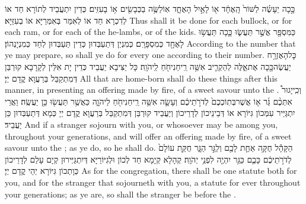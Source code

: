 {כָּ֣כָה יֵעָשֶׂ֗ה לַשּׁוֹר֙ הָֽאֶחָ֔ד א֖וֹ לָאַ֣יִל הָאֶחָ֑ד אֽוֹ\maqqaf לַשֶּׂ֥ה בַכְּבָשִׂ֖ים א֥וֹ בָעִזִּֽים׃}
{כְּדֵין יִתְעֲבֵיד לְתוֹרָא חַד אוֹ לְדִכְרָא חַד אוֹ לְאִמַּר בְּאִמְּרַיָּא אוֹ בְעִזַּיָּא׃}
{Thus shall it be done for each bullock, or for each ram, or for each of the he-lambs, or of the kids.}{}
{כַּמִּסְפָּ֖ר אֲשֶׁ֣ר תַּעֲשׂ֑וּ כָּ֛כָה תַּעֲשׂ֥וּ לָאֶחָ֖ד כְּמִסְפָּרָֽם׃}
{כְּמִנְיַן דְּתַעְבְּדוּן כְּדֵין תַּעְבְּדוּן לְחַד כְּמִנְיָנְהוֹן׃}
{According to the number that ye may prepare, so shall ye do for every one according to their number.}{}
{כׇּל\maqqaf הָאֶזְרָ֥ח יַעֲשֶׂה\maqqaf כָּ֖כָה אֶת\maqqaf אֵ֑לֶּה לְהַקְרִ֛יב אִשֵּׁ֥ה רֵֽיחַ\maqqaf נִיחֹ֖חַ לַֽיהֹוָֽה׃}
{כָּל יַצִּיבָא יַעֲבֵיד כְּדֵין יָת אִלֵּין לְקָרָבָא קוּרְבַּן דְּמִתְקַבַּל בְּרַעֲוָא קֳדָם יְיָ׃}
{All that are home-born shall do these things after this manner, in presenting an offering made by fire, of a sweet savour unto the \lord.}{}
{וְכִֽי\maqqaf יָגוּר֩ אִתְּכֶ֨ם גֵּ֜ר א֤וֹ אֲשֶׁר\maqqaf בְּתֽוֹכְכֶם֙ לְדֹרֹ֣תֵיכֶ֔ם וְעָשָׂ֛ה אִשֵּׁ֥ה רֵֽיחַ\maqqaf נִיחֹ֖חַ לַיהֹוָ֑ה כַּאֲשֶׁ֥ר תַּעֲשׂ֖וּ כֵּ֥ן יַעֲשֶֽׂה׃}
{וַאֲרֵי יִתְגַּיַּיר עִמְּכוֹן גִּיּוֹרָא אוֹ דְּבֵינֵיכוֹן לְדָרֵיכוֹן וְיַעֲבֵיד קוּרְבַּן דְּמִתְקַבַּל בְּרַעֲוָא קֳדָם יְיָ כְּמָא דְּתַעְבְּדוּן כֵּן יַעֲבֵיד׃}
{And if a stranger sojourn with you, or whosoever may be among you, throughout your generations, and will offer an offering made by fire, of a sweet savour unto the \lord; as ye do, so he shall do.}{}
{הַקָּהָ֕ל חֻקָּ֥ה אַחַ֛ת לָכֶ֖ם וְלַגֵּ֣ר הַגָּ֑ר חֻקַּ֤ת עוֹלָם֙ לְדֹרֹ֣תֵיכֶ֔ם כָּכֶ֛ם כַּגֵּ֥ר יִהְיֶ֖ה לִפְנֵ֥י יְהֹוָֽה׃}
{קְהָלָא קְיָמָא חַד לְכוֹן וּלְגִיּוֹרַיָּא דְּיִתְגַּיְּירוּן קְיָם עָלַם לְדָרֵיכוֹן כְּוָתְכוֹן גִּיּוֹרָא יְהֵי קֳדָם יְיָ׃}
{As for the congregation, there shall be one statute both for you, and for the stranger that sojourneth with you, a statute for ever throughout your generations; as ye are, so shall the stranger be before the \lord.}{}
